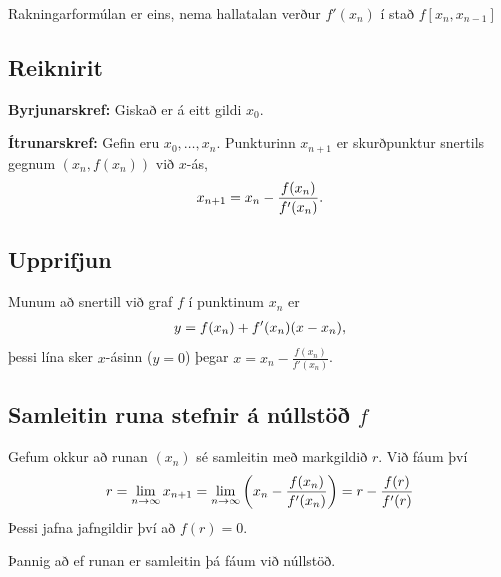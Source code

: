 \documentclass[A4paper,10pt,icelandic]{sphinxmanual}
\begin{document}
Rakningarformúlan er eins, nema hallatalan verður \(f'(x_n)\) í stað
\(f[x_n,x_{n-1}]\)


\subsection{Reiknirit}
\label{kafli02:id4}
\textbf{Byrjunarskref:} Giskað er á eitt gildi \(x_0\).

\textbf{Ítrunarskref:} Gefin eru \(x_0,\dots,x_n\). Punkturinn \(x_{n+1}\) er
skurðpunktur snertils gegnum \((x_n,f(x_n))\) við \(x\)-ás,
\begin{gather}
\begin{split}x_{n+1}=x_n-\dfrac{f(x_n)}{f'(x_n)}.\end{split}\notag
\end{gather}

\subsection{Upprifjun}
\label{kafli02:upprifjun}
Munum að snertill við graf \(f\) í punktinum \(x_n\) er
\begin{gather}
\begin{split}y=f(x_n) + f'(x_n)(x-x_n),\end{split}\notag
\end{gather}
þessi lína sker \(x\)-ásinn (\(y=0\)) þegar
\(x=x_n - \frac{f(x_n)}{f'(x_n)}\).


\subsection{Samleitin runa stefnir á núllstöð \(f\)}
\label{kafli02:id5}
Gefum okkur að runan \((x_n)\) sé samleitin með markgildið
\(r\). Við fáum því
\begin{gather}
\begin{split}r=\lim_{n\to \infty}x_{n+1}=\lim_{n\to \infty}
\bigg(x_n-\dfrac{f(x_n)}{f'(x_n)}\bigg) =r-\dfrac{f(r)}{f'(r)}\end{split}\notag
\end{gather}
Þessi jafna jafngildir því að \(f(r)=0\).

Þannig að ef runan er samleitin þá fáum við núllstöð.
\end{document}

